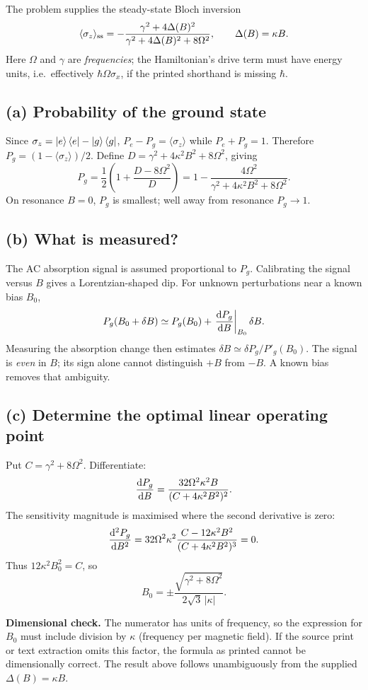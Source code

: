 
The problem supplies the steady-state Bloch inversion
\[
\langle\sigma_z\rangle_{\rm ss}
=-\frac{\gamma^2+4\Delta(B)^2}{
\gamma^2+4\Delta(B)^2+8\Omega^2},\qquad
\Delta(B)=\kappa B.
\]
Here \(\Omega\) and \(\gamma\) are \emph{frequencies};
the Hamiltonian's drive term must have energy units,
i.e.\ effectively \(\hbar\Omega\sigma_x\), if the
printed shorthand is missing \(\hbar\).

\subsection*{(a) Probability of the ground state}
Since \(\sigma_z=\left\lvert e\right\rangle\left\langle e\right\rvert-\left\lvert g\right\rangle\left\langle g\right\rvert\),
\(P_e-P_g=\langle\sigma_z\rangle\) while \(P_e+P_g=1\).
Therefore \(P_g=(1-\langle\sigma_z\rangle)/2\).
Define \(D=\gamma^2+4\kappa^2 B^2+8\Omega^2\), giving
\[
P_g=\frac12\left(1+\frac{D-8\Omega^2}{D}\right)
=\boxed{1-\frac{4\Omega^2}{
\gamma^2+4\kappa^2B^2+8\Omega^2}}.
\]
On resonance \(B=0\), \(P_g\) is smallest; well away
from resonance \(P_g\to1\).

\subsection*{(b) What is measured?}
The AC absorption signal is assumed proportional to \(P_g\).
Calibrating the signal versus \(B\) gives a Lorentzian-shaped
dip. For unknown perturbations near a known bias \(B_0\),
\[
P_g(B_0+\delta B)\simeq P_g(B_0)
+\left.\frac{\mathrm{d} P_g}{\mathrm{d} B}\right|_{B_0}\delta B.
\]
Measuring the absorption change then estimates
\(\delta B\simeq \delta P_g/P'_g(B_0)\).
The signal is \emph{even} in \(B\); its sign alone cannot
distinguish \(+B\) from \(-B\). A known bias removes that ambiguity.

\subsection*{(c) Determine the optimal linear operating point}
Put \(C=\gamma^2+8\Omega^2\). Differentiate:
\[
\frac{\mathrm{d} P_g}{\mathrm{d} B}
=\frac{32\Omega^2\kappa^2B}
{(C+4\kappa^2B^2)^2}.
\]
The sensitivity magnitude is maximised where
the second derivative is zero:
\[
\frac{\mathrm{d}^2 P_g}{\mathrm{d} B^2}
=32\Omega^2\kappa^2
\frac{C-12\kappa^2B^2}{(C+4\kappa^2 B^2)^3}=0.
\]
Thus \(12\kappa^2B_0^2=C\), so
\[
\boxed{B_0=\pm\frac{\sqrt{\gamma^2+8\Omega^2}}
{2\sqrt3\,|\kappa|}.}
\]
\begin{cautionbox}
\textbf{Dimensional check.} The numerator has units of
frequency, so the expression for \(B_0\) must include
division by \(\kappa\) (frequency per magnetic field).
If the source print or text extraction omits this factor,
the formula as printed cannot be dimensionally correct.
The result above follows unambiguously from the supplied
\(\Delta(B)=\kappa B\).
\end{cautionbox}
